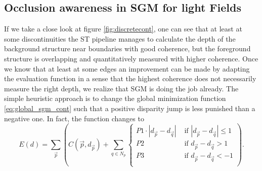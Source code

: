 \documentclass  [
  paper    = a4,
  BCOR     = 10mm,
  twoside,
  fontsize = 12pt,
  fleqn,
  toc      = bibnumbered,
  toc      = listofnumbered,
  numbers  = noendperiod,
  headings = normal,
  listof   = leveldown,
  version  = 3.03
]                                       {scrreprt}
\begin{document}
\subsection{Occlusion awareness in SGM for light Fields}
\label{sec:semiglobal3}
If we take a close look at figure \ref{fig:discretecont}, one can see that at least at some discontinuities the ST pipeline manages to calculate the depth of the background structure near boundaries with good coherence, but the foreground structure is overlapping and quantitatively measured with higher coherence. Once we know that at least at some edges an improvement can be made by adapting the evaluation function in a sense that the highest coherence does not necessarily measure the right depth, we realize that SGM is doing the job already. The simple heuristic approach is to change the global minimization function \ref{eq:global_sgm_cont} such that a positive disparity jump is less punished than a negative one. In fact, the function changes to
\begin{equation}\label{eq:global_sgm_cont_occlusion}
E(d) = \sum_{\vec p} \left(C(\vec{p}, d_{\vec p}) + \sum_{q\in N_p} 
\begin{cases}
P1\cdot |d_{\vec p} - d_{\vec q}|  & \text{ if }|d_{\vec p} - d_{\vec q}| \leq 1\\
P2 & \text{ if }d_{\vec p} - d_{\vec q} > 1\\
P3 & \text{ if }d_{\vec p} - d_{\vec q} < -1\\
\end{cases}  
\right).
\end{equation}
\end{document}
